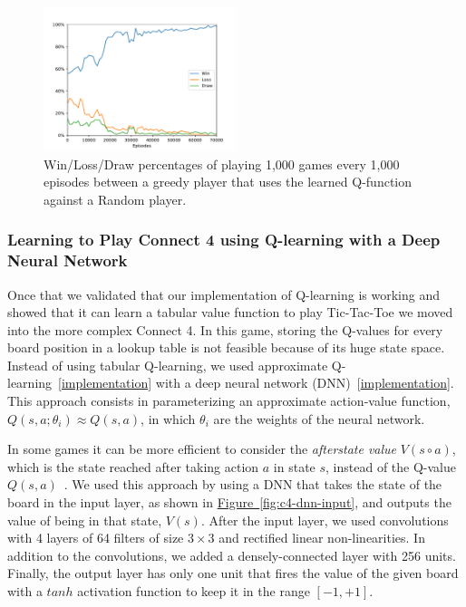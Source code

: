 \documentclass{article}
\newcommand{\GithubURL}[1]{[\href{https://github.com/davidrobles/mlnd-capstone-code/blob/master/#1}{implementation}]}
\begin{document}
\begin{figure}[!h]
    \centering
    \includegraphics[width=0.50\textwidth]{figures/tic_ql_tab_full_selfplay_wld_plot.pdf}
    \caption{Win/Loss/Draw percentages of playing 1,000 games every 1,000 episodes
             between a greedy player that uses the learned Q-function against a Random player.}
    \label{fig:tic-ql-tab-full-selfplay-wld-plot}
\end{figure}


\subsubsection{Learning to Play Connect 4 using Q-learning with a Deep Neural Network}

Once that we validated that our implementation of Q-learning is working and showed that it can learn
a tabular value function to play Tic-Tac-Toe we moved into the more complex Connect 4. In this game,
storing the Q-values for every board position in a lookup table is not feasible because of its huge
state space. Instead of using tabular Q-learning, we used approximate
Q-learning~\GithubURL{capstone/rl/learners/qlearning_approx.py} with a deep neural network
(DNN)~\GithubURL{capstone/rl/value_functions/c4deepnetwork.py}. This approach consists in
parameterizing an approximate action-value function, $Q(s,a;\theta_i) \approx Q(s,a)$, in which
$\theta_i$ are the weights of the neural network.

In some games it can be more efficient to consider the \emph{afterstate value} $V(s \circ a)$, which
is the state reached after taking action $a$ in state $s$, instead of the Q-value $Q(s,
a)$~\citep{Sutton1998RL}. We used this approach by using a DNN that takes the state of the board in
the input layer, as shown in \hyperref[fig:c4-dnn-input] {Figure~\ref*{fig:c4-dnn-input}}, and
outputs the value of being in that state, $V(s)$. After the input layer, we used convolutions with 4
layers of 64 filters of size $3\times3$ and rectified linear non-linearities. In addition to the
convolutions, we added a densely-connected layer with 256 units. Finally, the output layer has only
one unit that fires the value of the given board with a $tanh$ activation function to keep it in the
range $[-1, +1]$.
\end{document}
